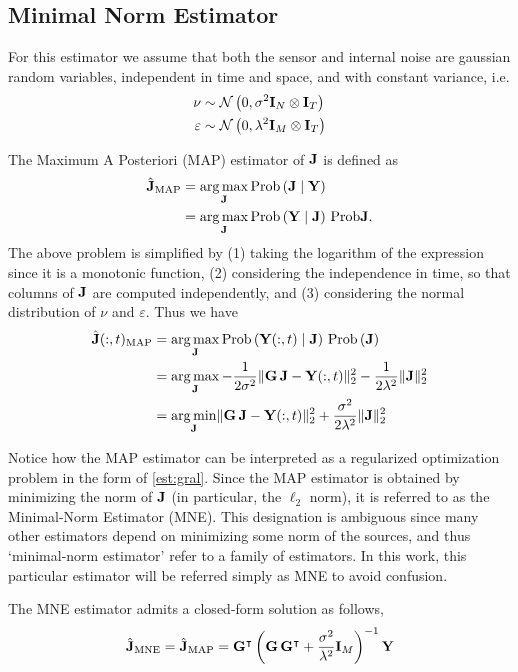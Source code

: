 \subsection{Minimal Norm Estimator}

For this estimator we assume that both the sensor and internal noise are gaussian random variables, independent in time and space, and with constant variance, i.e.
\begin{align}
\nu &\sim \mathcal{N}\left( 0, \sigma^2 \mathbf{I}_N \otimes \mathbf{I}_T   \right) \\
\varepsilon &\sim \mathcal{N}\left( 0, \lambda^2 \mathbf{I}_M \otimes \mathbf{I}_T \right)
\end{align}

The Maximum A Posteriori (MAP) estimator of $\mathbf{J}$ is defined as
\begin{align}
\hat{\mathbf{J}}_\text{MAP} 
&=
\operatorname*{arg\,max}_{\mathbf{J}} \text{Prob}\left(  \mathbf{J} \;\middle|\; \mathbf{Y}  \right)
\nonumber \\
&=
\operatorname*{arg\,max}_{\mathbf{J}} \text{Prob}\left(  \mathbf{Y} \;\middle|\; \mathbf{J}  \right)\, \text{Prob}{\mathbf{J}}.
\end{align}
The above problem is simplified by (1) taking the logarithm of the expression since it is a monotonic function, (2) considering the independence in time, so that columns of $\mathbf{J}$ are computed independently, and (3) considering the normal distribution of $\nu$ and $\varepsilon$.
%
Thus we have
\begin{align}
\hat{\mathbf{J}}(:,t)_\text{MAP} 
&=
\operatorname*{arg\,max}_{\mathbf{J}} \text{Prob}\left(  \mathbf{Y}(:,t) \;\middle|\; \mathbf{J}  \right)\, \text{Prob}\left( \mathbf{J} \right)
\nonumber \\
&=
\operatorname*{arg\,max}_{\mathbf{J}}
- \frac{1}{2\sigma^2} \lVert \mathbf{G}\, \mathbf{J} - \mathbf{Y}(:,t) \rVert_2^2 
- \frac{1}{2\lambda^2} \lVert \mathbf{J}  \rVert_2^2 
\nonumber \\
&=
\operatorname*{arg\,min}_{\mathbf{J}}
\lVert \mathbf{G}\, \mathbf{J} - \mathbf{Y}(:,t) \rVert_2^2 
+ \frac{\sigma^2}{2\lambda^2} \lVert \mathbf{J}  \rVert_2^2 
\end{align}

Notice how the MAP estimator can be interpreted as a regularized optimization problem in the form of \eqref{est:gral}.
%
Since the MAP estimator is obtained by minimizing the norm of $\mathbf{J}$ (in particular, the $\ell_2$ norm), it is referred to as the Minimal-Norm Estimator (MNE).
%
This designation is ambiguous since many other estimators depend on minimizing some norm of the sources, and thus `minimal-norm estimator' refer to a family of estimators. 
%
In this work, this particular estimator will be referred simply as MNE to avoid confusion.

The MNE estimator admits a closed-form solution as follows,
\begin{equation}
\hat{\mathbf{J}}_\text{MNE}
=
\hat{\mathbf{J}}_\text{MAP}
=
\mathbf{G}^\intercal\left(  \mathbf{G}\, \mathbf{G}^\intercal + \frac{\sigma^2}{\lambda^2}\mathbf{I}_M  \right)^{-1} \mathbf{Y}
\end{equation}


